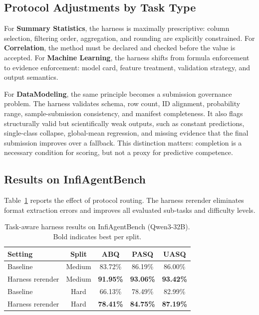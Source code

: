 \documentclass[letterpaper]{article} %
\begin{document}
\subsection{Protocol Adjustments by Task Type}

For \textbf{Summary Statistics}, the harness is maximally prescriptive: column selection, filtering order, aggregation, and rounding are explicitly constrained.  For \textbf{Correlation}, the method must be declared and checked before the value is accepted.  For \textbf{Machine Learning}, the harness shifts from formula enforcement to evidence enforcement: model card, feature treatment, validation strategy, and output semantics.

For \textbf{DataModeling}, the same principle becomes a submission governance problem.  The harness validates schema, row count, ID alignment, probability range, sample-submission consistency, and manifest completeness.  It also flags structurally valid but scientifically weak outputs, such as constant predictions, single-class collapse, global-mean regression, and missing evidence that the final submission improves over a fallback.  This distinction matters: completion is a necessary condition for scoring, but not a proxy for predictive competence.

\subsection{Results on InfiAgentBench}

Table~\ref{tab:task_results} reports the effect of protocol routing.  The harness rerender eliminates format extraction errors and improves all evaluated sub-tasks and difficulty levels.

\begin{table}[t]
\centering
\caption{Task-aware harness results on InfiAgentBench (Qwen3-32B). Bold indicates best per split.}
\label{tab:task_results}
\begin{tabular}{lcccc}
\toprule
\textbf{Setting} & \textbf{Split} & \textbf{ABQ} & \textbf{PASQ} & \textbf{UASQ} \\
\midrule
Baseline & Medium & 83.72\% & 86.19\% & 86.00\% \\
Harness rerender & Medium & \textbf{91.95\%} & \textbf{93.06\%} & \textbf{93.42\%} \\
\midrule
Baseline & Hard & 66.13\% & 78.49\% & 82.99\% \\
Harness rerender & Hard & \textbf{78.41\%} & \textbf{84.75\%} & \textbf{87.19\%} \\
\bottomrule
\end{tabular}
\end{table}
\end{document}
